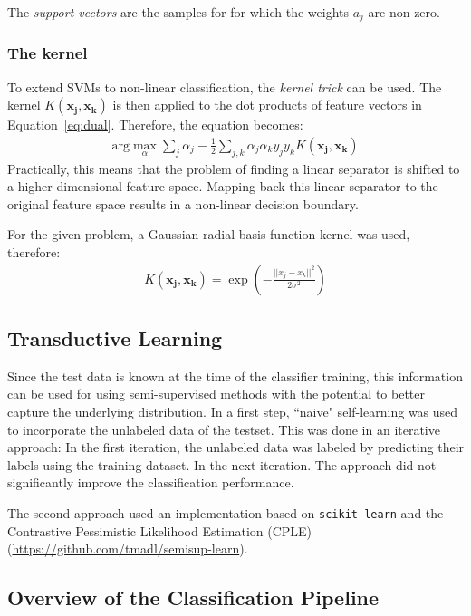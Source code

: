 \documentclass{article}
\begin{document}
The \emph{support vectors} are the samples for for which the weights $a_j$ are non-zero. 

\subsubsection{The kernel}
\label{sec:kernel}

To extend SVMs to non-linear classification, the \emph{kernel trick}
can be used. The kernel $K(\mathbf{x_j}, \mathbf{x_k})$ is then applied to the dot products of feature vectors in Equation~\ref{eq:dual}. Therefore, the equation becomes:
\begin{align}
\label{eq:dualkernel}
\text{arg}\max_\alpha\sum_j\alpha_j - \frac{1}{2}\sum_{j,k}\alpha_j\alpha_ky_jy_kK(\mathbf{x_j}, \mathbf{x_k})
\end{align} 
Practically, this means that the problem of finding a linear separator is shifted to a higher dimensional feature space. Mapping back this linear separator to the original feature space results in a non-linear decision boundary. 

For the given problem, a Gaussian radial basis function kernel was used, therefore:
\begin{align}
K(\mathbf{x_j}, \mathbf{x_k}) = \exp(-\frac{||x_j - x_k ||^2}{2\sigma^2})
\end{align}


\subsection{Transductive Learning}

Since the test data is known at the time of the classifier training, this information can be used for using semi-supervised methods with the potential to better capture the underlying distribution. In a first step, ``naive" self-learning was used to incorporate the unlabeled data of the testset. This was done in an iterative approach: In the first iteration, the unlabeled data was labeled by predicting their labels using the training dataset. In the next iteration. The approach did not significantly improve the classification performance. 

The second approach used an implementation based on \texttt{scikit-learn} and the Contrastive Pessimistic Likelihood Estimation (CPLE) (\url{https://github.com/tmadl/semisup-learn}). 



\subsection{Overview of the Classification Pipeline}
\end{document}
